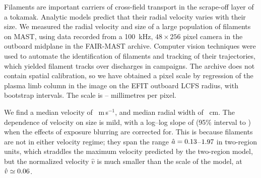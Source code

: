 Filaments are important carriers of cross-field transport in the scrape-off layer of a tokamak. Analytic models predict that their radial velocity varies with their size. We measured the radial velocity and size of a large population of filaments on MAST, using data recorded from a 100~kHz, $48 \times 256$ pixel camera in the outboard midplane in the FAIR-MAST archive. Computer vision techniques were used to automate the identification of filaments and tracking of their trajectories, which yielded \nTracksSel{} filament tracks over \nShotsStats{} discharges in \nCampaigns{} campaigns. The archive does not contain spatial calibration, so we have obtained a pixel scale by regression of the plasma limb column in the image on the EFIT outboard LCFS radius, with bootstrap intervals. The scale is \scaleOwnMin--\scaleOwnMax{} millimetres per pixel.

We find a median velocity of \vMedAll{}~m\,s$^{-1}$, and median radial width of \dMedAll{}~cm. The dependence of velocity on size is mild, with a log--log slope of \vdSlopePooledBlur{} (95\% interval \vdSlopePooledBlurLo{} to \vdSlopePooledBlurHi) when the effects of exposure blurring are corrected for. This is because filaments are not in either velocity regime; they span the range $\hat a = 0.13$--$1.97$ in two-region units, which straddles the maximum velocity predicted by the two-region model, but the normalized velocity $\hat v$ is much smaller than the scale of the model, at $\hat v \simeq 0.06$.
